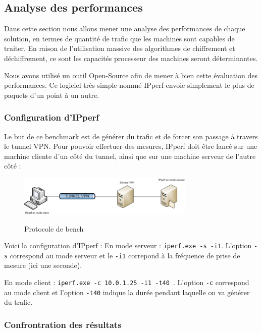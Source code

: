 \subsection{Analyse des performances}

Dans cette section nous allons mener une analyse des performances de chaque solution, en termes de quantité de trafic que les machines sont capables de traiter. En raison de l'utilisation massive des algorithmes de chiffrement et déchiffrement, ce sont les capacités processeur des machines seront déterminantes.

Nous avons utilisé un outil Open-Source afin de mener à bien cette évaluation des performances. Ce logiciel très simple nommé IPperf envoie simplement le plus de paquets d'un point à un autre.

\subsubsection{Configuration d'IPperf}

Le but de ce benchmark est de générer du trafic et de forcer son passage à travers le tunnel VPN. Pour pouvoir effectuer des mesures, IPperf doit être lancé sur une machine cliente d'un côté du tunnel, ainsi que sur une machine serveur de l'autre côté :

\begin{figure}[H]
	\begin{center}
		\includegraphics[width=0.75\textwidth]{partie_3/images/ipperf.png}\\
	\end{center}
	\caption{Protocole de bench}
	\label{Protocole_de_test}
\end{figure}

Voici la configuration d'IPperf :
En mode serveur : \verb|iperf.exe -s -i1|. L'option \verb|-s| correspond au mode serveur et le \verb|-i1| correpond à la fréquence de prise de mesure (ici une seconde).

En mode client : \verb|iperf.exe -c 10.0.1.25 -i1 -t40 |. L'option \verb|-c| correspond au mode client et l'option \verb|-t40| indique la durée pendant laquelle on va générer du trafic.

\subsubsection{Confrontration des résultats}

